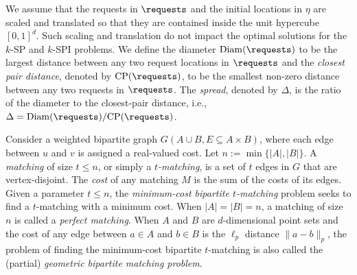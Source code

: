 We assume that the requests in $\requests$ and the initial locations in $\eta$ are scaled and translated so that they are contained inside the unit hypercube $[0,1]^d$. Such scaling and translation do not impact the optimal solutions for the $k$-SP and $k$-SPI problems. We define the diameter $\mathrm{Diam}(\requests)$ to be the largest distance between any two request locations in $\requests$ and the \emph{closest pair distance}, denoted by $\mathrm{CP}(\requests)$, to be the smallest non-zero distance between any two requests in $\requests$. The \emph{spread}, denoted by $\Delta$, is the ratio of the diameter to the closest-pair distance, i.e., $\Delta=\mathrm{Diam}(\requests)/\mathrm{CP}(\requests)$. 

 Consider a weighted bipartite graph $G(A\cup B, E\subseteq A\times B)$, where each edge between $u$ and $v$ is assigned a real-valued cost. Let $n:=\min\{|A|, |B|\}$. A \emph{matching} of size $t\le n$, or simply a \emph{$t$-matching}, is a set of $t$ edges in $G$ that are vertex-disjoint. The \emph{cost} of any matching $M$ is the sum of the costs of its edges. Given a parameter $t \le n$, the \emph{minimum-cost bipartite $t$-matching} problem seeks to find a $t$-matching with a minimum cost. %
When $|A|=|B|=n$, a matching of size $n$ is called a \emph{perfect matching}. When $A$ and $B$ are $d$-dimensional point sets and the cost of any edge between $a \in A$ and $b \in B$ is the $\ell_p$ distance $\|a-b\|_p$, the problem of finding the minimum-cost bipartite $t$-matching is also called the (partial) \emph{geometric bipartite matching problem}. 




